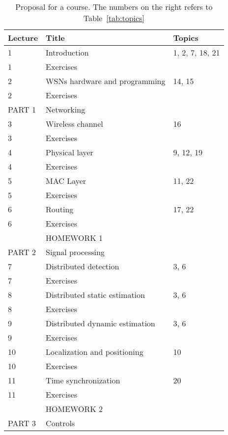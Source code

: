 \documentclass[onecolumn,12pt,draftclsnofoot,a4paper,peerreview]{IEEEtran}
\begin{document}
\begin{table}[t]
\tiny
\begin{center}
\caption{Proposal for a course. The numbers on the right refers to Table~\ref{tab:topics}}
  \begin{tabular}{||  l || l  || l  ||  }
   \hline Lecture & Title & Topics \\
   \hline
    \hline 1 & Introduction &  1, 2, 7, 18,  21\\
     \hline 1 & Exercises  &  \\
    \hline 2 & WSNs hardware and programming & 14, 15 \\
    \hline 2 &  Exercises & \\
     \hline
     \hline PART 1  & Networking &   \\
       \hline
    \hline 3 & Wireless channel & 16 \\
    \hline 3 & Exercises & \\
    \hline 4 & Physical layer  & 9, 12, 19\\
     \hline 4 & Exercises  & \\
    \hline 5 & MAC Layer &  11, 22\\
    \hline 5 & Exercises &  \\
    \hline 6 & Routing  &  17, 22\\
     \hline 6 & Exercises  &  \\
      \hline
     \hline   & HOMEWORK 1 &   \\
       \hline
    \hline
     \hline PART 2  & Signal processing &   \\
       \hline
    \hline 7 & Distributed detection &  3, 6\\
      \hline 7 & Exercises &  \\
    \hline 8 & Distributed static estimation & 3, 6 \\
      \hline 8 & Exercises &  \\
       \hline 9 & Distributed dynamic estimation & 3, 6 \\
      \hline 9 & Exercises &  \\
    \hline 10 & Localization and positioning  & 10 \\
      \hline 10 & Exercises &  \\
    \hline 11 & Time synchronization  &  20 \\
      \hline 11 & Exercises  &  \\
      \hline
     \hline   & HOMEWORK 2 &   \\
       \hline
      \hline
     \hline PART 3 & Controls &   \\

\end{tabular}
\end{center}
\end{table}
\end{document}
